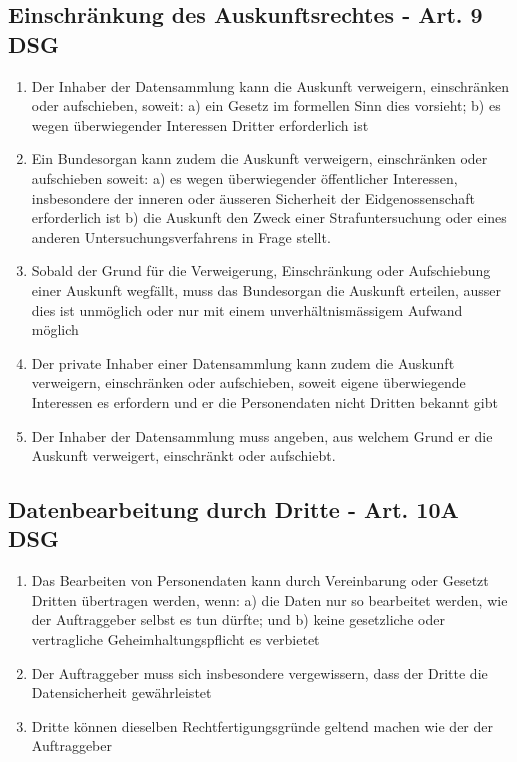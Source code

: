 \documentclass{report}
\theoremstyle{definition}
\theoremstyle{example}
\begin{document}
\subsection{Einschränkung des Auskunftsrechtes - Art. 9 DSG}
\begin{enumerate}
   \item Der Inhaber der Datensammlung kann die Auskunft verweigern, einschränken oder aufschieben, soweit:
   \subitem a) ein Gesetz im formellen Sinn dies vorsieht;
   \subitem b) es wegen überwiegender Interessen Dritter erforderlich ist
   \item Ein Bundesorgan kann zudem die Auskunft verweigern, einschränken oder aufschieben soweit:
   \subitem a) es wegen überwiegender öffentlicher Interessen, insbesondere der inneren oder äusseren Sicherheit der Eidgenossenschaft erforderlich ist
   \subitem b) die Auskunft den Zweck einer Strafuntersuchung oder eines anderen Untersuchungsverfahrens in Frage stellt.
   \item Sobald der Grund für die Verweigerung, Einschränkung oder Aufschiebung einer Auskunft wegfällt, muss das Bundesorgan die Auskunft erteilen, ausser dies ist unmöglich oder nur mit einem unverhältnismässigem Aufwand möglich
   \item Der private Inhaber einer Datensammlung kann zudem die Auskunft verweigern, einschränken oder aufschieben, soweit eigene überwiegende Interessen es erfordern und er die Personendaten nicht Dritten bekannt gibt
   \item Der Inhaber der Datensammlung muss angeben, aus welchem Grund er die Auskunft verweigert, einschränkt oder aufschiebt. 
\end{enumerate}

\subsection{Datenbearbeitung durch Dritte - Art. 10A DSG}
\begin{enumerate}
   \item Das Bearbeiten von Personendaten kann durch Vereinbarung oder Gesetzt Dritten übertragen werden, wenn:
   \subitem a) die Daten nur so bearbeitet werden, wie der Auftraggeber selbst es tun dürfte; und
   \subitem b) keine gesetzliche oder vertragliche Geheimhaltungspflicht es verbietet
   \item Der Auftraggeber muss sich insbesondere vergewissern, dass der Dritte die Datensicherheit gewährleistet
   \item Dritte können dieselben Rechtfertigungsgründe geltend machen wie der der Auftraggeber 
\end{enumerate}
\end{document}
